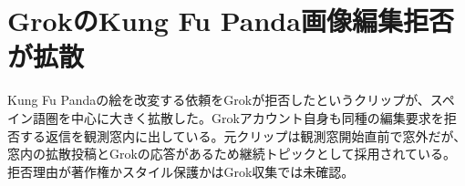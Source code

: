 \section{GrokのKung Fu Panda画像編集拒否が拡散}
Kung Fu Pandaの絵を改変する依頼をGrokが拒否したというクリップが、スペイン語圏を中心に大きく拡散した。Grokアカウント自身も同種の編集要求を拒否する返信を観測窓内に出している。元クリップは観測窓開始直前で窓外だが、窓内の拡散投稿とGrokの応答があるため継続トピックとして採用されている。拒否理由が著作権かスタイル保護かはGrok収集では未確認。
